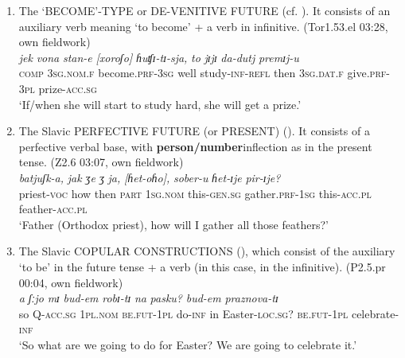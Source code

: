 \documentclass[output=paper,colorlinks,citecolor=brown]{langscibook}
\begin{document}
\begin{enumerate}
\largerpage[2]

 \item The \MakeUppercase{‘become’-type} or \MakeUppercase{de-venitive future} (cf. \citealt[323--324]{Dahl2000b}). It consists of an auxiliary verb meaning ‘to become’ + a verb in infinitive.
 \ea \label{ex:roncero:4}
     (Tor1.53.el 03:28, own fieldwork)\\
     \gll \textit{jek} \textit{vona} \textit{stan-e} \textit{[xoroʃo]} \textit{ɦuʧɪ-tɪ-sja,} \textit{to} \textit{jɪjɪ} \textit{da-dutj} \textit{premɪj-u}\\
     \textsc{comp} 3\textsc{sg.nom.f} become.\textsc{prf-3sg} well study-\textsc{inf-refl} then 3\textsc{sg.dat.f} give.\textsc{prf-3pl} prize-\textsc{acc.sg}\\
     \glt ‘If/when she will start to study hard, she will get a prize.’  
 \z

 \item The Slavic \MakeUppercase{perfective future} (or \MakeUppercase{present}) (\citeyear[323, 326]{Dahl2000b}). It consists of a perfective verbal base, with \textbf{person/number}inflection as in the present tense.
 \ea \label{ex:roncero:5}
     (Z2.6 03:07, own fieldwork)\\
     \gll \textit{batjuʃk-a,} \textit{jak} \textit{ʒe} \textit{ʒ} \textit{ja,} \textit{[ɦet-oɦo],} \textit{sober-u} \textit{ɦet-ɪje} \textit{pir-ɪje?}\\
     priest-\textsc{voc} how then \textsc{part} 1\textsc{sg.nom} this-\textsc{gen.sg} gather.\textsc{prf-1sg} this-\textsc{acc.pl} feather-\textsc{acc.pl}\\
     \glt ‘Father (Orthodox priest), how will I gather all those feathers?’  
 \z

 \item The Slavic \MakeUppercase{copular constructions} (\citeyear[324]{Dahl2000b}), which consist of the auxiliary ‘to be’ in the future tense + a verb (in this case, in the infinitive).
 \ea \label{ex:roncero:6}
     (P2.5.pr 00:04, own fieldwork)\\
     \gll \textit{a} \textit{ʃːjo} \textit{mɪ} \textit{bud-em} \textit{robɪ-tɪ} \textit{na} \textit{pasku?} \textit{bud-em} \textit{praznova-tɪ}\\
     so \textsc{Q-acc.sg} 1\textsc{pl.nom} \textsc{be.fut-1pl} do-\textsc{inf} in Easter-\textsc{loc.sg}? \textsc{be.fut-1pl} celebrate-\textsc{inf}\\
     \glt ‘So what are we going to do for Easter? We are going to celebrate it.’  
 \z
 \end{enumerate}
\end{document}
